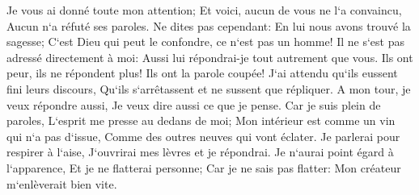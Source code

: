 \verse Je vous ai donné toute mon attention; Et voici, aucun de vous ne l`a convaincu, Aucun n`a réfuté ses paroles. 
\verse Ne dites pas cependant: En lui nous avons trouvé la sagesse; C`est Dieu qui peut le confondre, ce n`est pas un homme! 
\verse Il ne s`est pas adressé directement à moi: Aussi lui répondrai-je tout autrement que vous. 
\verse Ils ont peur, ils ne répondent plus! Ils ont la parole coupée! 
\verse J`ai attendu qu`ils eussent fini leurs discours, Qu`ils s`arrêtassent et ne sussent que répliquer. 
\verse A mon tour, je veux répondre aussi, Je veux dire aussi ce que je pense. 
\verse Car je suis plein de paroles, L`esprit me presse au dedans de moi; 
\verse Mon intérieur est comme un vin qui n`a pas d`issue, Comme des outres neuves qui vont éclater. 
\verse Je parlerai pour respirer à l`aise, J`ouvrirai mes lèvres et je répondrai. 
\verse Je n`aurai point égard à l`apparence, Et je ne flatterai personne; 
\verse Car je ne sais pas flatter: Mon créateur m`enlèverait bien vite. 

\chapter{}

